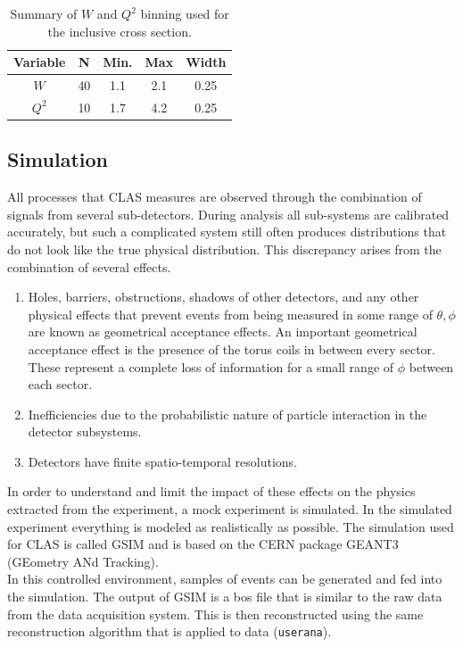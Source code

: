 \begin{table}
  \centering
  \begin{tabular}{c|c|c|c|c}
    Variable & N & Min. & Max & Width \\
    \hline 
    $W$   & 40 & 1.1 & 2.1 & 0.25 \\
    $Q^2$ & 10 & 1.7 & 4.2 & 0.25
  \end{tabular}
  \caption{Summary of $W$ and $Q^2$ binning used for the inclusive cross section.}
  \label{table:bins}
\end{table}

\subsection{Simulation}
All processes that CLAS measures are observed through the combination of signals from several sub-detectors.  During analysis all sub-systems are calibrated accurately, but such a complicated system still often produces distributions that do not look like the true physical distribution.  This discrepancy arises from the combination of several effects.

\begin{enumerate}
	\item Holes, barriers, obstructions, shadows of other detectors, and any other physical effects that prevent events from being measured in some range of $\theta, \phi$ are known as geometrical acceptance effects.  An important geometrical acceptance effect is the presence of the torus coils in between every sector.  These represent a complete loss of information for a small range of $\phi$ between each sector.
	\item Inefficiencies due to the probabilistic nature of particle interaction in the detector subsystems.
	\item Detectors have finite spatio-temporal resolutions.  
\end{enumerate}

In order to understand and limit the impact of these effects on the physics extracted from the experiment, a mock experiment is simulated.  In the simulated experiment everything is modeled as realistically as possible.  The simulation used for CLAS is called GSIM and is based on the CERN package GEANT3 (GEometry ANd Tracking).\\
In this controlled environment, samples of events can be generated and fed into the simulation.  The output of GSIM is a bos file that is similar to the raw data from the data acquisition system. This is then reconstructed using the same reconstruction algorithm that is applied to data (\texttt{userana}).  \\ 

